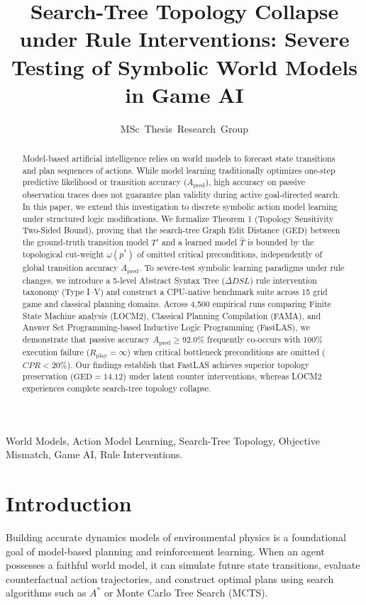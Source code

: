 \documentclass[journal]{IEEEtran}
\begin{document}
\title{Search-Tree Topology Collapse under Rule Interventions: Severe Testing of Symbolic World Models in Game AI}

\author{MSc~Thesis~Research~Group}

\maketitle

\begin{abstract}
Model-based artificial intelligence relies on world models to forecast state transitions and plan sequences of actions. While model learning traditionally optimizes one-step predictive likelihood or transition accuracy ($A_{\text{pred}}$), high accuracy on passive observation traces does not guarantee plan validity during active goal-directed search. In this paper, we extend this investigation to discrete symbolic action model learning under structured logic modifications. We formalize Theorem 1 (Topology Sensitivity Two-Sided Bound), proving that the search-tree Graph Edit Distance ($\text{GED}$) between the ground-truth transition model $T'$ and a learned model $\hat{T}$ is bounded by the topological cut-weight $\omega(p^*)$ of omitted critical preconditions, independently of global transition accuracy $A_{\text{pred}}$. To severe-test symbolic learning paradigms under rule changes, we introduce a 5-level Abstract Syntax Tree ($\Delta DSL$) rule intervention taxonomy (Type I--V) and construct a CPU-native benchmark suite across 15 grid game and classical planning domains. Across 4,500 empirical runs comparing Finite State Machine analysis (LOCM2), Classical Planning Compilation (FAMA), and Answer Set Programming-based Inductive Logic Programming (FastLAS), we demonstrate that passive accuracy $A_{\text{pred}} \ge 92.0\%$ frequently co-occurs with $100\%$ execution failure ($R_{\text{play}} = \infty$) when critical bottleneck preconditions are omitted ($CPR < 20\%$). Our findings establish that FastLAS achieves superior topology preservation ($\text{GED} = 14.12$) under latent counter interventions, whereas LOCM2 experiences complete search-tree topology collapse.
\end{abstract}

\begin{IEEEkeywords}
World Models, Action Model Learning, Search-Tree Topology, Objective Mismatch, Game AI, Rule Interventions.
\end{IEEEkeywords}

\section{Introduction}
Building accurate dynamics models of environmental physics is a foundational goal of model-based planning and reinforcement learning. When an agent possesses a faithful world model, it can simulate future state transitions, evaluate counterfactual action trajectories, and construct optimal plans using search algorithms such as $A^*$ or Monte Carlo Tree Search (MCTS).
\end{document}

